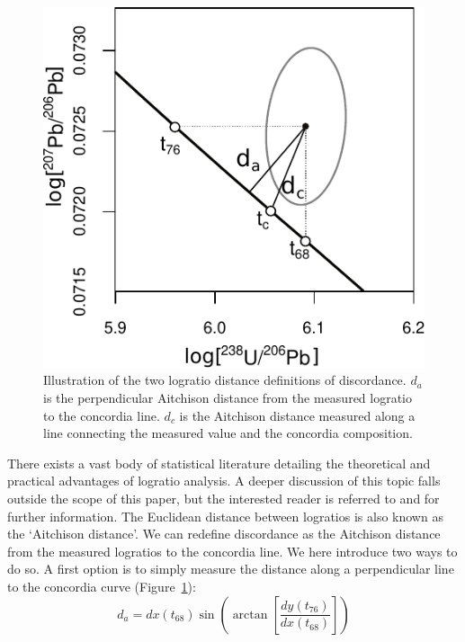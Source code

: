 \documentclass[gchron, manuscript]{copernicus}
\begin{document}
\begin{figure}
  \includegraphics[width=\textwidth]{Aitchison.pdf}
  \caption{Illustration of the two logratio distance definitions of
    discordance. $d_a$ is the perpendicular Aitchison distance from
    the measured logratio to the concordia line. $d_c$ is the
    Aitchison distance measured along a line connecting the measured
    value and the concordia composition.
  }
  \label{fig:aitchison}
\end{figure}

There exists a vast body of statistical literature detailing the
theoretical and practical advantages of logratio analysis. A deeper
discussion of this topic falls outside the scope of this paper, but
the interested reader is referred to \citet{aitchison1986} and
\citet{pawlowsky2015} for further information. The Euclidean distance
between logratios is also known as the `Aitchison distance'.  We can
redefine discordance as the Aitchison distance from the measured
logratios to the concordia line. We here introduce two ways to do so.
A first option is to simply measure the distance along a perpendicular
line to the concordia curve (Figure~\ref{fig:aitchison}):
\begin{equation}
  d_{a} = dx(t_{68})
  \sin\!\left(\arctan\!\left[ \frac{dy(t_{76})}{dx(t_{68})} \right]
  \right)
  \label{eq:dperp}
\end{equation}
\end{document}
